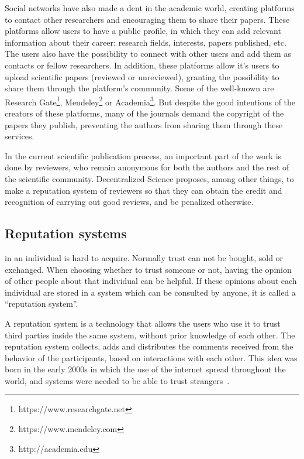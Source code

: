 Social networks have also made a dent in the academic world, creating platforms
to contact other researchers and encouraging them to share their papers. These
platforms allow users to have a public profile, in which they can add relevant
information about their career: research fields, interests, papers published,
etc. The users also have the possibility to connect with other users and add
them as contacts or fellow researchers. In addition, these platforms allow it's
users to upload scientific papers (reviewed or unreviewed), granting the
possibility to share them through the platform's community. Some of the
well-known are Research Gate\footnote{https://www.researchgate.net},
Mendeley\footnote{https://www.mendeley.com} or
Academia\footnote{http://academia.edu}. But despite the good intentions of the
creators of these platforms, many of the journals demand the copyright of the
papers they publish, preventing the authors from sharing them through these
services.

In the current scientific publication process, an important part of the work is
done by reviewers, who remain anonymous for both the authors and the rest of the
scientific community. Decentralized Science proposes, among other things, to
make a reputation system of reviewers so that they can obtain the credit and
recognition of carrying out good reviews, and be penalized otherwise.

\subsection{Reputation systems}
\label{scb:rs}

 in an individual is hard to acquire. Normally trust can not be bought,
sold or exchanged. When choosing whether to trust someone or not, having the
opinion of other people about that individual can be helpful. If these opinions
about each individual are stored in a system which can be consulted by anyone,
it is called a ``reputation system''.

A reputation system is a technology that allows the users who use it to trust
third parties inside the same system, without prior knowledge of each other. The
reputation system collects, adds and distributes the comments received from the
behavior of the participants, based on interactions with each other. This idea
was born in the early 2000s in which the use of the internet spread throughout
the world, and systems were needed to be able to trust
strangers~\cite{resnick2000reputation}.

